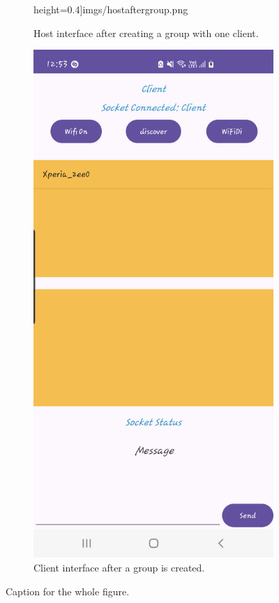 \begin{figure}
\begin{subfigure}[b]{0.3\textwidth}
            height=0.4\textheight]{imgs/hostaftergroup.png}
        \caption{Host interface after creating a group with one client.}
        \label{group:host}
    \end{subfigure}
    \hspace{1cm}
    \begin{subfigure}[b]{0.3\textwidth}
        \includegraphics[width=\textwidth,
            height=0.4\textheight]{imgs/clientAfterDiscovery.png}
        \caption{Client interface after a group is created.}
        \label{group:client}
    \end{subfigure}
    \caption{Caption for the whole figure.}
    \label{group}
\end{figure}


